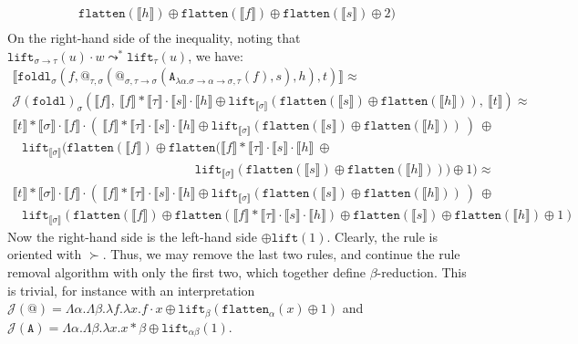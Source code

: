 \documentclass[a4paper,UKenglish,cleveref,autoref,numberwithinsect]{lipics-v2019}
\theoremstyle{definition}
\newcommand{\arrtype}{\rightarrow}
\newcommand{\abs}[2]{\lambda #1.#2}
\newcommand{\arrW}{\leadsto}
\newcommand{\flatten}{\mathtt{flatten}}
\newcommand{\lift}{\mathtt{lift}}
\newcommand{\typeinterpret}[1]{\llbracket #1 \rrbracket}
\newcommand{\interpret}[1]{\llbracket #1 \rrbracket}
\newcommand{\Termmap}{\mathcal{J}}
\begin{document}
\begin{example}
\[\begin{array}{l}
\flatten(\interpret{h}) \oplus
\flatten(\interpret{f}) \oplus\flatten(\interpret{s}) \oplus 2) \\
\end{array}
\]
On the right-hand side of the inequality, noting that
$\lift_{\sigma \arrtype \tau}(u) \cdot w \arrW^*
\lift_{\tau}(u)$, we have:
\[
\begin{array}{l}
\interpret{\mathtt{foldl}_\sigma(f,@_{\tau,\sigma}(@_{\sigma,\tau
    \arrtype\sigma}(
      \mathtt{A}_{\abs{\alpha}{\sigma\arrtype\alpha\arrtype\sigma},
      \tau}(f),s),h),t)} \approx \\
\Termmap(\mathtt{foldl})_\sigma(\interpret{f},\ 
  \interpret{f} * \typeinterpret{\tau} \cdot \interpret{s} \cdot
  \interpret{h} \oplus \lift_{\typeinterpret{\sigma}}(\flatten(\interpret{s})
  \oplus \flatten(\interpret{h})),\ \interpret{t}) \approx \\
\interpret{t} * \typeinterpret{\sigma} \cdot \interpret{f} \cdot
  (\ \interpret{f} * \typeinterpret{\tau} \cdot \interpret{s} \cdot
  \interpret{h} \oplus \lift_{\typeinterpret{\sigma}}(\flatten(\interpret{s})
  \oplus \flatten(\interpret{h}))\ )\ \oplus \\
\phantom{A}
  \lift_{\typeinterpret{\sigma}}(\flatten(\interpret{f}) \oplus
  \flatten(\interpret{f} * \typeinterpret{\tau} \cdot \interpret{s} \cdot
  \interpret{h}\ \oplus \\
  \phantom{ABCDEFGHIJKLMNOPQRSt}
  \lift_{\typeinterpret{\sigma}}(\flatten(\interpret{s})
  \oplus \flatten(\interpret{h}))) \oplus 1) \approx \\
\interpret{t} * \typeinterpret{\sigma} \cdot \interpret{f} \cdot
  (\ \interpret{f} * \typeinterpret{\tau} \cdot \interpret{s} \cdot
  \interpret{h} \oplus \lift_{\typeinterpret{\sigma}}(\flatten(\interpret{s})
  \oplus \flatten(\interpret{h}))\ )\ \oplus \\
\phantom{A}
  \lift_{\typeinterpret{\sigma}}(\flatten(\interpret{f}) \oplus
  \flatten(\interpret{f} * \typeinterpret{\tau} \cdot \interpret{s} \cdot
  \interpret{h}) \oplus \flatten(\interpret{s}) \oplus \flatten(\interpret{h}) \oplus 1)
\end{array}
\]
Now the right-hand side is the left-hand side $\oplus \lift(1)$.
Clearly, the rule is oriented with $\succ$.  Thus, we may remove the
last two rules, and continue the rule removal algorithm with only the
first two, which together define $\beta$-reduction.  This is trivial,
for instance with an interpretation
$\Termmap(@) = \Lambda \alpha.\Lambda \beta.\lambda f.\lambda x.
f \cdot x \oplus \lift_\beta(\flatten_\alpha(x) \oplus 1)$ and
$\Termmap(\mathtt{A}) = \Lambda \alpha.\Lambda \beta.\lambda x.
x * \beta \oplus \lift_{\alpha\beta}(1)$.
\end{example}
\end{document}
